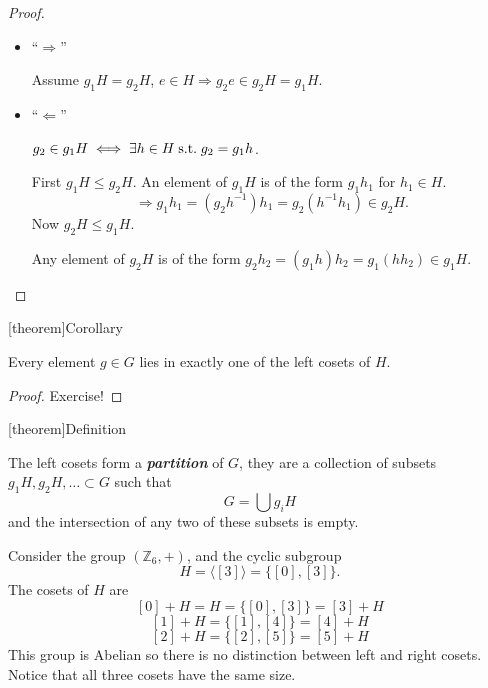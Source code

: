 \documentclass[12pt]{report}
\theoremstyle{definition}
\begin{document}
\begin{proof}
   \;

    \begin{itemize}
            \item ``$\Rightarrow{}$''

                Assume $g_1 H = g_2 H$, $e \in H \Rightarrow{} g_2 e \in g_2 H = g_1 H$.
                
            \item ``$\Leftarrow$''

                $g_2 \in g_1 H \iff \exists h \in H \;\textnormal{s.t.}\; g_2 = g_1 h$.

                First $g_1 H \le g_2 H$.
                An element of $g_1 H$ is of the form $g_1 h_1$ for $h_1 \in H$.
                \[
                    \Rightarrow{} g_1 h_1 = (g_2 h^{-1}) h_1 = g_2 (h^{-1} h_1) \in g_2 H.
                \]
                Now $g_2 H \le g_1 H$.

                Any element of $g_2 H$ is of the form $g_2 h_2
                = (g_1 h) h_2 = g_1 (h h_2) \in g_1 H$.
    \end{itemize}
\end{proof}

[theorem]{Corollary}
\begin{g in one of the left coset of H}
    Every element $g \in G$ lies in exactly one of the left cosets of $H$.
\end{g in one of the left coset of H}

\begin{proof}
    Exercise!
\end{proof}

[theorem]{Definition}
\begin{partition of G}
    The left cosets form a \textbf{\emph{partition}} of $G$, they are a collection of subsets
    $g_1H, g_2H,\ldots \subset G$ such that \[
        G = \bigcup g_i H
    \]and the intersection of any two of these subsets is empty.
\end{partition of G}

\begin{ex}
    Consider the group $(\mathbb{Z}_6, +)$, and the cyclic subgroup\[
        H = \langle [3] \rangle = \{[0],[3]\}.
    \]The cosets of $H$ are \[
    [0] + H = H = \{[0],[3]\} = [3] + H
    \]\[
    [1] + H = \{[1],[4]\} = [4] + H
    \]\[
    [2] + H = \{[2],[5]\} = [5] + H
    \]
    This group is Abelian so there is no distinction between left and right cosets.
    Notice that all three cosets have the same size.
\end{ex}
\end{document}
